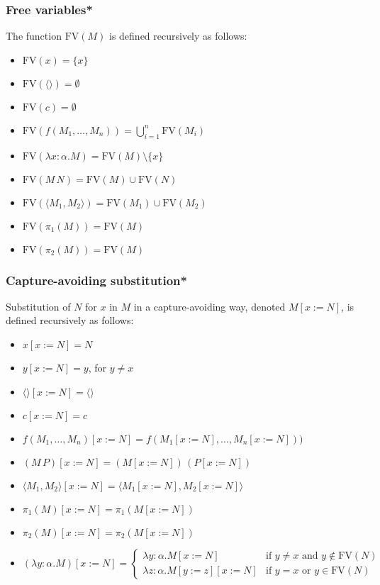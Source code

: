 \documentclass[aspectratio=169]{beamer}
\begin{document}
\begin{frame}
\frametitle{Free variables*}
The function $\text{FV}(M)$ is defined recursively as follows:
\begin{itemize}
    \item $\text{FV}(x) = \{x\}$
    \item $\text{FV}(\langle \rangle) = \emptyset$
    \item $\text{FV}(c) = \emptyset$
    \item $\text{FV}(f(M_1, \ldots, M_n)) = \bigcup_{i=1}^{n} \text{FV}(M_i)$
    \item $\text{FV}(\lambda x: \alpha. M) = \text{FV}(M) \setminus \{x\}$
    \item $\text{FV}(M \, N) = \text{FV}(M) \cup \text{FV}(N)$
    \item $\text{FV}(\langle M_1, M_2 \rangle) = \text{FV}(M_1) \cup \text{FV}(M_2)$
    \item $\text{FV}(\pi_1(M)) = \text{FV}(M)$
    \item $\text{FV}(\pi_2(M)) = \text{FV}(M)$
\end{itemize}
\end{frame}

\begin{frame}
\frametitle{Capture-avoiding substitution*}

Substitution of $N$ for $x$ in $M$ in a capture-avoiding way, denoted $M[x := N]$, is defined recursively as follows:

\begin{itemize}
    \item $x[x := N] = N$
    \item $y[x := N] = y$, for $y \neq x$
    \item $\langle \rangle[x := N] = \langle \rangle$
    \item $c[x := N] = c$
    \item $f(M_1, \ldots, M_n)[x := N] = f(M_1[x := N], \ldots, M_n[x := N]))$
    \item $(M \, P)[x := N] = (M[x := N]) \, (P[x := N])$
    \item $\langle M_1 , M_2 \rangle[x := N] = \langle M_1[x := N], M_2[x := N] \rangle$
    \item $\pi_1(M)[x := N] = \pi_1(M[x := N])$
    \item $\pi_2(M)[x := N] = \pi_2(M[x := N])$
    \item $(\lambda y : \alpha. M)[x := N] =
    \begin{cases}
    \lambda y : \alpha. M[x := N] & \text{if } y \neq x \text{ and } y \notin \text{FV}(N) \\
    \lambda z : \alpha. M[y := z][x := N] & \text{if } y = x \text{ or } y \in \text{FV}(N)
    \end{cases}$
\end{itemize}
\end{frame}
\end{document}
